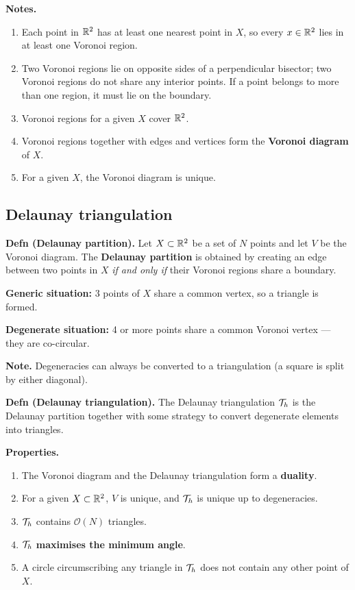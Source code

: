 \medskip\noindent
\textbf{Notes.}
\begin{enumerate}[label=(\arabic*),leftmargin=2.4em,itemsep=2pt]
\item Each point in $\mathbb{R}^{2}$ has at least one nearest point in $X$, so every
  $x\in\mathbb{R}^{2}$ lies in at least one Voronoi region.
\item Two Voronoi regions lie on opposite sides of a perpendicular bisector;
  two Voronoi regions do not share any interior points. If a point belongs to
  more than one region, it must lie on the boundary.
\item Voronoi regions for a given $X$ cover $\mathbb{R}^{2}$.
\item Voronoi regions together with edges and vertices form the
  \textbf{Voronoi diagram} of $X$.
\item For a given $X$, the Voronoi diagram is unique.
\end{enumerate}

\subsection*{Delaunay triangulation}

\textbf{Defn (Delaunay partition).} Let $X\subset\mathbb{R}^{2}$ be a set of $N$
points and let $V$ be the Voronoi diagram. The \textbf{Delaunay partition} is
obtained by creating an edge between two points in $X$ \emph{if and only if}
their Voronoi regions share a boundary.

\medskip\noindent
\textbf{Generic situation:} 3 points of $X$ share a common vertex, so a
triangle is formed.

\medskip\noindent
\textbf{Degenerate situation:} 4 or more points share a common Voronoi vertex
--- \ie they are co-circular.

\medskip\noindent
\textbf{Note.} Degeneracies can always be converted to a triangulation (a
square is split by either diagonal).

\medskip\noindent
\textbf{Defn (Delaunay triangulation).} The Delaunay triangulation $\mathcal{T}_{h}$ is the
Delaunay partition together with some strategy to convert degenerate elements
into triangles.

\medskip\noindent
\textbf{Properties.}
\begin{enumerate}[label=(\arabic*),leftmargin=2.4em,itemsep=2pt]
\item The Voronoi diagram and the Delaunay triangulation form a \textbf{duality}.
\item For a given $X\subset\mathbb{R}^{2}$, $V$ is unique, and $\mathcal{T}_{h}$ is unique up to
  degeneracies.
\item $\mathcal{T}_{h}$ contains $\mathcal{O}(N)$ triangles.
\item $\mathcal{T}_{h}$ \textbf{maximises the minimum angle}.
\item A circle circumscribing any triangle in $\mathcal{T}_{h}$ does not contain any other
  point of $X$.
\end{enumerate}


